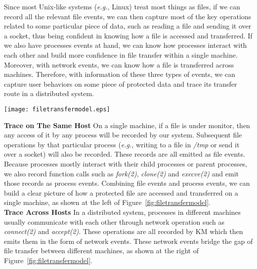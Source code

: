 \documentclass[letterpaper,twocolumn,10pt]{article}
\begin{document}
Since most Unix-like systems (\textit{e.g.}, Linux) treat most things as
files, if we can record all the relevant file events, we can then capture
most of the key operations related to some particular piece of data, such as
reading a file and sending it over a socket, thus being confident in knowing
how a file is accessed and transferred. If we also have 
processes events at hand, we can know how processes interact with each other
and build more confidence in file transfer within a single machine. Moreover,
with network events, we can know how a file is transferred across machines.
Therefore, with information of these three types of events, we can capture
user behaviors on some piece of protected data and trace its transfer route
in a distributed system.\\

\begin{figure*}
    \centering
    \texttt{[image: filetransfermodel.eps]}
    \caption{left: file access and transfer in a single machine. right: distributed system }
    \label{fig:filetransfermodel}
\end{figure*}

\noindent
\textbf{Trace on The Same Host} On a single machine, if a file is under
monitor, then any access of it by any process will be recorded by our
system. Subsequent file operations by that particular process (\textit{e.g.},
writing to a file in \textit{/tmp} or send it over a socket) will also be
recorded. These records are all emitted as file events. Because processes
mostly interact with their child processes or parent processes, we also
record function calls such as \textit{fork(2)}, \textit{clone(2)} and
\textit{execve(2)} and emit those records as process events. Combining file
events and process events, we can build a clear picture of how a protected
file are accessed and transferred on a single machine, as shown at the left
of Figure~\ref{fig:filetransfermodel}.\\ 

\noindent
\textbf{Trace Across Hosts} In a distributed system, processes in different
machines usually communicate with each other through network operation such
as \textit{connect(2)} and \textit{accept(2)}. These operations are all
recorded by KM which then emits them in the form of network events. These
network events bridge the gap of file transfer between different machines, as
shown at the right of Figure~\ref{fig:filetransfermodel}.\\
\end{document}
